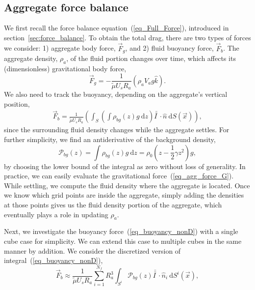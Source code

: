 \subsection{Aggregate force balance}
We first recall the force balance equation~(\ref{eq_Full_Force}), introduced in section~\ref{sec:force_balance}. To obtain the total drag, there are two types of forces we consider: 1) aggregate body force, $\vec{F}_g$, and 2) fluid buoyancy force, $\vec{F}_b$. 
The aggregate density, $\rho_a$, of the fluid portion changes over time, which affects its (dimensionless) gravitational body force,
\begin{equation}
	\vec{F}_g = 
	- \frac{1}{\tilde{\mu} U_s R_a} 
	\left( \rho_a V_a g \hat{k}	 \right).
	\label{eq_agg_force_G}
\end{equation}
We also need to track the buoyancy, depending on the aggregate's vertical position,
\begin{align}
	\vec{F}_{b}
	 = \frac{1}{\tilde{\mu} U_s R_a} 
	 \left(
	  \int_{S} \left( 
	  \int \rho_{bg}(z) g \ \textrm{d}z 
	  \right) \bar{\bar{I \ }}  \cdot
	 \hat{n} \ \textrm{d}S (\vec{x})
   \right),
   \label{eq_buoyancy_nonD}
\end{align}
since the surrounding fluid density changes while the aggregate settles.
For further simplicity, we find an antiderivative of the background density,
\begin{equation}
	\mathcal{P}_{bg}(z) =  \int \rho_{bg}(z) g \ \textrm{d}z 
	 = \rho_0 \left( z - \frac{1}{2}\gamma z^2 \right) g,
\end{equation}
by choosing the lower bound of the integral as zero without loss of generality.
In practice, we can easily evaluate the gravitational force~(\ref{eq_agg_force_G}). While settling, we compute the fluid density where the aggregate is located. Once we know which grid points are inside the aggregate, simply adding the densities at those points gives us the fluid density portion of the aggregate, which eventually plays a role in updating $\rho_a$. 
\par
Next, we investigate the buoyancy force~(\ref{eq_buoyancy_nonD}) with a single cube case for simplicity. 
We can extend this case to multiple cubes in the same manner by addition. We consider the discretized version of integral~(\ref{eq_buoyancy_nonD}), 
\begin{equation}
	\vec{F}_b \approx
	\frac{1}{\tilde{\mu} U_s R_a} 
	\sum_{i=1}^{N_f}
	 R_a^3 \int_{S^i} 
		\mathcal{P}_{bg}(z) 
	 \bar{\bar{I \ }}  \cdot
	\hat{n}_i \ \textrm{d}S^i (\vec{x}),
\label{eq_buoyancy_discrete2}
\end{equation}
